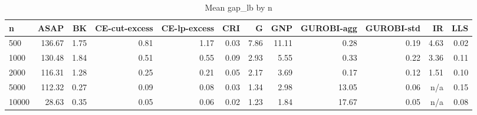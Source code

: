 \begin{table}[htbp]
\centering
\small
\caption{Mean gap\_lb by n}
\label{tab:E6_scalability_b120_by_n}
\begin{tabular}{lrrrrrrrrrrr}
\toprule
n & ASAP & BK & CE-cut-excess & CE-lp-excess & CRI & G & GNP & GUROBI-agg & GUROBI-std & IR & LLS \\
\midrule
500 & 136.67 & 1.75 & 0.81 & 1.17 & 0.03 & 7.86 & 11.11 & 0.28 & 0.19 & 4.63 & 0.02 \\
1000 & 130.48 & 1.84 & 0.51 & 0.55 & 0.09 & 2.93 & 5.55 & 0.33 & 0.22 & 3.36 & 0.11 \\
2000 & 116.31 & 1.28 & 0.25 & 0.21 & 0.05 & 2.17 & 3.69 & 0.17 & 0.12 & 1.51 & 0.10 \\
5000 & 112.32 & 0.27 & 0.09 & 0.08 & 0.03 & 1.34 & 2.98 & 13.05 & 0.06 & n/a & 0.15 \\
10000 & 28.63 & 0.35 & 0.05 & 0.06 & 0.02 & 1.23 & 1.84 & 17.67 & 0.05 & n/a & 0.08 \\
\bottomrule
\end{tabular}
\end{table}
